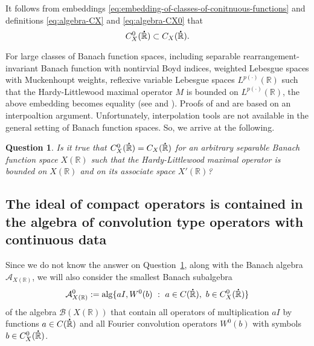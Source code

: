 \documentclass[reqno]{amsproc}
\newcommand{\cA}{\mathcal{A}}
\newcommand{\cB}{\mathcal{B}}
\newcommand{\dR}{{\bf\dot{\R}}}
\newcommand{\R}{\mathbb{R}}
\newtheorem{question}[theorem]{Question}
\theoremstyle{definition}
\theoremstyle{remark}
\numberwithin{equation}{section}
\begin{document}
It follows from embeddings 
\eqref{eq:embedding-of-classes-of-conitnuous-functions} and definitions 
\eqref{eq:algebra-CX} and \eqref{eq:algebra-CX0} that
\begin{equation}\label{eq:embeddings-of-classes-of-continuous-multipliers}
C_{X}^0(\dR)\subset C_{X}(\dR).
\end{equation}

For large classes of Banach function spaces, including separable
rearrangement-invariant Banach function with nontirvial Boyd indices,
weighted Lebesgue spaces with Muckenhoupt weights, reflexive variable 
Lebesgue spaces $L^{p(\cdot)}(\R)$ such that the Hardy-Littlewood
maximal operator $M$ is bounded on $L^{p(\cdot)}(\R)$, the above
embedding becomes equality (see \cite[Theorem~3.3]{FK20} and
\cite[Theorem~1.1]{K20}). Proofs of \cite[Theorem~3.3]{FK20}
and \cite[Theorem~1.1]{K20} are based on an interpoaltion argument. 
Unfortunately, interpolation tools are not available in the general setting
of Banach function spaces. So, we arrive at the following.
\begin{question}\label{question-1}
Is it true that $C_{X}^0(\dR)= C_{X}(\dR)$ for an arbitrary
separable Banach function space $X(\R)$ such that the Hardy-Littlewood
maximal operator is bounded on $X(\R)$ and on its associate space
$X'(\R)$?
\end{question}

\subsection{The ideal of compact operators is contained in the 
algebra of convolution type operators with continuous data}
Since we do not know the answer on Question~\ref{question-1}, 
along with the Banach algebra $\cA_{X(\R)}$, we will also consider
the smallest Banach subalgebra
\[
\cA_{X(\R)}^0
:=
\operatorname{alg}\{aI,W^0(b)\ :\ a\in C(\dR),\ b\in C_X^0(\dR)\}
\]
of the algebra $\cB(X(\R))$ that contain all operators of multiplication $aI$ 
by functions $a\in C(\dR)$ and all Fourier convolution operators $W^0(b)$ with 
symbols $b\in C_X^0(\dR)$.
\end{document}
